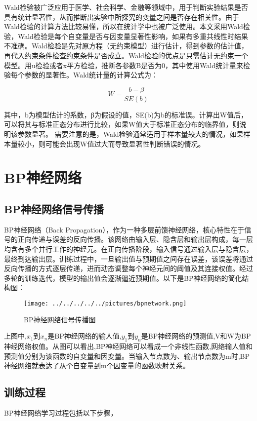 Wald检验被广泛应用于医学、社会科学、金融等领域中，用于判断实验结果是否具有统计显著性，从而推断出实验中所探究的变量之间是否存在相关性。由于Wald检验的计算方法比较易懂，所以在统计学中也被广泛使用。本文采用Wald检验，Wald检验是每个自变量是否与因变量显著性影响，如果有多重共线性时结果不准确。Wald检验是先对原方程（无约束模型）进行估计，得到参数的估计值，再代入约束条件检查约束条件是否成立。Wald检验的优点是只需估计无约束一个模型。用u检验或者x平方检验，推断各参数B是否为0，其中使用Wald统计量来检验每个参数的显著性。Wald统计量的计算公式为：

\begin{equation}
	W = \frac{b-\beta}{SE(b)} 
\end{equation}

其中，b为模型估计的系数，β为假设的值，SE(b)为b的标准误。计算出W值后，可以将其与标准正态分布进行比较，如果W值大于标准正态分布的临界值，则说明该参数显著。
需要注意的是，Wald检验通常适用于样本量较大的情况，如果样本量较小，则可能会出现W值过大而导致显著性判断错误的情况。


\section{BP神经网络}
\subsection{BP神经网络信号传播}
BP神经网络（Back Propagation），作为一种多层前馈神经网络，核心特性在于信号的正向传递与误差的反向传播。该网络由输入层、隐含层和输出层构成，每一层均含有多个并行工作的神经元。在正向传播阶段，输入信号通过输入层与隐含层，最终到达输出层。训练过程中，一旦输出值与预期值之间存在误差，该误差将通过反向传播的方式逐层传递，进而动态调整每个神经元间的阈值及其连接权值。经过多轮的训练迭代，模型的输出值会逐渐逼近预期值。以下是BP神经网络的简化结构图：

\begin{figure}[!h]
	\centering
	\texttt{[image: ../../../../../pictures/bpnetwork.png]}
	\caption{BP神经网络信号传播图}
\end{figure}

上图中,$x_1$到$x_n$是BP神经网络的输人值,$y_1$到$y_n$是BP神经网络的预测值,V和W为BP神经网络权值。从图可以看出,BP神经网络可以看成一个非线性函数,网络输人值和预测值分别为该函数的自变量和因变量。当输入节点数为、输出节点数为m时,BP神经网络就表达了从个自变量到m个因变量的函数映射关系。

\subsection{训练过程}
BP神经网络学习过程包括以下步骤，

